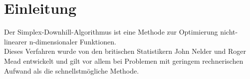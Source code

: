 \chapter{Einleitung}
Der Simplex-Downhill-Algorithmus ist eine Methode zur Optimierung nicht-linearer n-dimensionaler Funktionen. \\
Dieses Verfahren wurde von den britischen Statistikern John Nelder und Roger Mead entwickelt und gilt vor allem bei Problemen mit 
geringem rechnerischen Aufwand als die schnellstmögliche Methode. 
